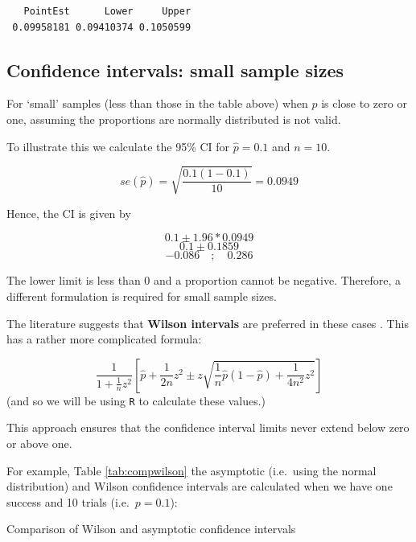 \documentclass[
  oneside]{krantz}
\begin{document}
\begin{verbatim}
   PointEst      Lower     Upper
 0.09958181 0.09410374 0.1050599
\end{verbatim}

\hypertarget{confidence-intervals-small-sample-sizes}{%
\subsection{Confidence intervals: small sample sizes}\label{confidence-intervals-small-sample-sizes}}

For `small' samples (less than those in the table above) when \(p\) is close to zero or one, assuming the proportions are normally distributed is not valid.

To illustrate this we calculate the 95\% CI for \(\hat p=0.1\) and \(n=10\).

\[se(\hat p) = \sqrt{\frac{0.1 (1-0.1)}{10}} = 0.0949\]

Hence, the CI is given by

\[0.1 \pm 1.96*0.0949\]
\[0.1 \pm 0.1859 \]
\[-0.086 \quad ; \quad 0.286 \]

The lower limit is less than 0 and a proportion cannot be negative. Therefore, a different formulation is required for small sample sizes.

The literature suggests that \textbf{Wilson intervals} are preferred in these cases \citep{Agresti1998}. This has a rather more complicated formula:

\[\frac{1}{1+{\frac{1}{n}}z^{2}}\left[{\hat {p}}+{\frac{1}{2n}}z^{2}\pm z{\sqrt{{\frac {1}{n}}{\hat{p}}\left(1-{\hat{p}}\right)+{\frac {1}{4n^{2}}}z^{2}}}\right]\]
(and so we will be using \texttt{R} to calculate these values.)

This approach ensures that the confidence interval limits never extend below zero or above one.

For example, Table \ref{tab:compwilson} the asymptotic (i.e.~using the normal distribution) and Wilson confidence intervals are calculated when we have one success and 10 trials (i.e.~\(p=0.1\)):

\label{tab:compwilson} Comparison of Wilson and asymptotic confidence intervals
\end{document}
